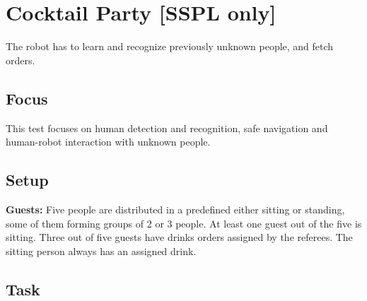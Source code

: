 \section{Cocktail Party [SSPL only]}

The robot has to learn and recognize previously unknown people, and fetch orders.

\subsection{Focus}

This test focuses on human detection and recognition, safe navigation and human-robot interaction with unknown people.

\subsection{Setup}
	\item \textbf{Guests:} Five people are distributed in a predefined  either sitting or standing, some of them forming groups of 2 or 3 people. At least one guest out of the five is sitting. Three out of five guests have drinks orders assigned by the referees. The sitting person always has an assigned drink.

\subsection{Task}

